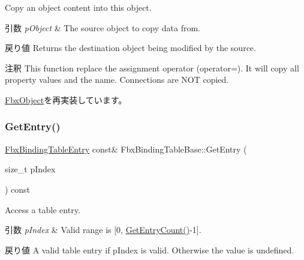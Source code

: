 Copy an object content into this object. 
\begin{DoxyParams}{引数}
{\em p\+Object} & The source object to copy data from. \\
\hline
\end{DoxyParams}
\begin{DoxyReturn}{戻り値}
Returns the destination object being modified by the source. 
\end{DoxyReturn}
\begin{DoxyRemark}{注釈}
This function replace the assignment operator (operator=). It will copy all property values and the name. Connections are N\+OT copied. 
\end{DoxyRemark}


\hyperlink{class_fbx_object_a0c0c5adb38284d14bb82c04d54504a3e}{Fbx\+Object}を再実装しています。

\mbox{\label{class_fbx_binding_table_base_add6e787cc1decf0bfc57a2489cc96c1a}} 
\subsubsection{\texorpdfstring{Get\+Entry()}{GetEntry()}\hspace{0.1cm}{\footnotesize\ttfamily [1/2]}}
{\footnotesize\ttfamily \hyperlink{class_fbx_binding_table_entry}{Fbx\+Binding\+Table\+Entry} const\& Fbx\+Binding\+Table\+Base\+::\+Get\+Entry (\begin{DoxyParamCaption}\item[{size\+\_\+t}]{p\+Index }\end{DoxyParamCaption}) const}

Access a table entry. 
\begin{DoxyParams}{引数}
{\em p\+Index} & Valid range is \mbox{[}0, \hyperlink{class_fbx_binding_table_base_a0a5379cd46e7e6dcf6f48bbd262034d8}{Get\+Entry\+Count()}-\/1\mbox{]}. \\
\hline
\end{DoxyParams}
\begin{DoxyReturn}{戻り値}
A valid table entry if p\+Index is valid. Otherwise the value is undefined. 
\end{DoxyReturn}
\mbox{\label{class_fbx_binding_table_base_a589d64fd21e06cb6206dfd290017b42a}} 
